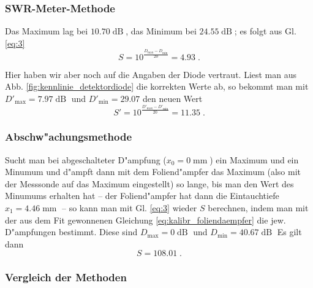 \documentclass[a4paper,12pt]{article}
\begin{document}
\subsubsection{SWR-Meter-Methode}
\label{sec:swr_meter_methode}


Das Maximum lag bei $10.70\operatorname{dB}$, das Minimum bei
$24.55\operatorname{dB}$; es folgt aus Gl. \eqref{eq:3}
\begin{equation}
  S = 10^{ \frac{ D_\text{max} - D_\text{min} } {20} } = 4.93 \;.
\end{equation}


Hier haben wir aber noch auf die Angaben der Diode vertraut. Liest man
aus Abb. \ref{fig:kennlinie_detektordiode} die korrekten Werte ab, so
bekommt man mit $D'_\text{max} = 7.97\operatorname{dB}$ und
$D'_\text{min} = 29.07$ den neuen Wert
\begin{equation*}
  S' = 10^{ \frac{ D'_\text{max} - D'_\text{min} } {20} } =
  11.35 \;.
\end{equation*}



\subsubsection{Abschw"achungsmethode}
\label{sec:abschwachungsmethode}



Sucht man bei abgeschalteter D"ampfung ($x_0=0\operatorname{mm}$) ein
Maximum und ein Minumum und d"ampft dann mit dem Foliend"ampfer das
Maximum (also mit der Messsonde auf das Maximum eingestellt) so
lange, bis man den Wert des Minumums erhalten hat -- der
Foliend"ampfer hat dann die Eintauchtiefe $x_1 =
4.46\operatorname{mm}$ -- so kann man mit Gl. \eqref{eq:3} wieder $S$
berechnen, indem man mit der aus dem Fit gewonnenen Gleichung
\eqref{eq:kalibr_foliendaempfer} die jew. D"ampfungen bestimmt. Diese
sind $D_\text{max} = 0\operatorname{dB}$ und $D_\text{min} = 40.67\operatorname{dB}$ Es
gilt dann
\begin{equation*}
  S = 108.01 \;.
\end{equation*}


 

\subsubsection{Vergleich der Methoden}
\label{sec:vergleich_der_methoden}
\end{document}
